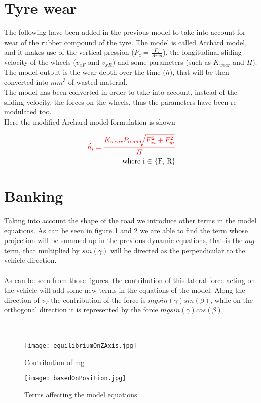 \documentclass{report}
\let\Oldsection\section
\renewcommand{\section}{\FloatBarrier\Oldsection}
\begin{document}
\section{Tyre wear}

The \color{red} following \color{black} have been added in the previous model to take into account for wear of the rubber compound of the tyre. The model is called Archard model, and it makes use of the vertical pression ($P_z = \frac{F_z}{Area}$), the longitudinal sliding velocity of the wheels ($v_{xF}$ and $v_{xR}$) and some parameters (such as $K_{wear}$ and $H$). The model output is the wear depth over the time ($\dot{h}$), that will be then converted into $mm^3$ of wasted material.\\The model has been converted in order to take into account, instead of the sliding velocity, the forces on the wheels, thus the parameters have been re-modulated too.\\
Here the modified Archard model formulation is shown

\begin{equation}
\begin{aligned}
\color{red} \dot{h_i} = \frac{K_{wear} P_{load} \sqrt{F_{xi}^2+F_{yi}^2}}{H} \color{black}\\
\text{where i $\in$ \{F, R\}}
\end{aligned}
\end{equation}

\section{Banking}

Taking into account the shape of the road we introduce other terms in the model equations. As can be seen in figure \ref{fig:contribmg} and \ref{fig:basedonpos} we are able to find the term whose projection will be summed up in the previous dynamic equations, that is the $mg$ term, that multiplied by $sin(\gamma)$ will be directed as the perpendicular to the vehicle direction.\\\\ 
As can be seen from those figures, the contribution of this lateral force acting on the vehicle will add some new terms in the equations of the model.
Along the direction of $v_T$ the contribution of the force is \color{red} $mgsin(\gamma)sin(\beta)$\color{black}, while on the orthogonal direction it is
represented by the force \color{red} $mgsin(\gamma)cos(\beta)$\color{black}.\\\\
\\
\begin{figure}[h!]
    \centering
    \texttt{[image: equilibriumOnZAxis.jpg]}
    \caption{Contribution of mg}
    \label{fig:contribmg}
\end{figure}
\begin{figure}[h!]
    \centering
    \texttt{[image: basedOnPosition.jpg]}
    \caption{Terms affecting the model equations}
    \label{fig:basedonpos}
\end{figure}
\end{document}
